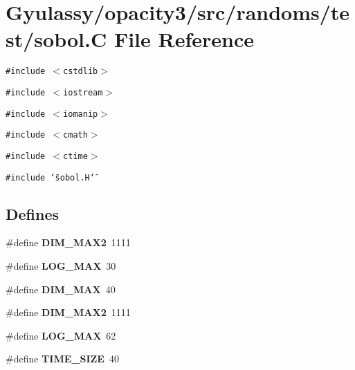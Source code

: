 \section{Gyulassy/opacity3/src/randoms/test/sobol.C File Reference}
\label{sobol_8C}
{\tt \#include $<$cstdlib$>$}\par
{\tt \#include $<$iostream$>$}\par
{\tt \#include $<$iomanip$>$}\par
{\tt \#include $<$cmath$>$}\par
{\tt \#include $<$ctime$>$}\par
{\tt \#include \char`\"{}sobol.H\char`\"{}}\par
\subsection*{Defines}
\begin{CompactItemize}
\item 
\#define {\bf DIM\_\-MAX2}~1111
\item 
\#define {\bf LOG\_\-MAX}~30
\item 
\#define {\bf DIM\_\-MAX}~40
\item 
\#define {\bf DIM\_\-MAX2}~1111
\item 
\#define {\bf LOG\_\-MAX}~62
\item 
\#define {\bf TIME\_\-SIZE}~40
\end{CompactItemize}
